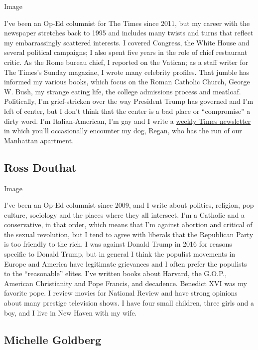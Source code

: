 Image

I've been an Op-Ed columnist for The Times since 2011, but my career
with the newspaper stretches back to 1995 and includes many twists and
turns that reflect my embarrassingly scattered interests. I covered
Congress, the White House and several political campaigns; I also spent
five years in the role of chief restaurant critic. As the Rome bureau
chief, I reported on the Vatican; as a staff writer for The Times's
Sunday magazine, I wrote many celebrity profiles. That jumble has
informed my various books, which focus on the Roman Catholic Church,
George W. Bush, my strange eating life, the college admissions process
and meatloaf. Politically, I'm grief-stricken over the way President
Trump has governed and I'm left of center, but I don't think that the
center is a bad place or ``compromise'' a dirty word. I'm
Italian-American, I'm gay and I write a
\href{https://www.nytimes3xbfgragh.onion/newsletters/frank-bruni}{weekly
Times newsletter} in which you'll occasionally encounter my dog, Regan,
who has the run of our Manhattan apartment.

\hypertarget{ross-douthat}{%
\subsection{Ross Douthat}\label{ross-douthat}}

Image

I've been an Op-Ed columnist since 2009, and I write about politics,
religion, pop culture, sociology and the places where they all
intersect. I'm a Catholic and a conservative, in that order, which means
that I'm against abortion and critical of the sexual revolution, but I
tend to agree with liberals that the Republican Party is too friendly to
the rich. I was against Donald Trump in 2016 for reasons specific to
Donald Trump, but in general I think the populist movements in Europe
and America have legitimate grievances and I often prefer the populists
to the ``reasonable'' elites. I've written books about Harvard, the
G.O.P., American Christianity and Pope Francis, and decadence. Benedict
XVI was my favorite pope. I review movies for National Review and have
strong opinions about many prestige television shows. I have four small
children, three girls and a boy, and I live in New Haven with my wife.

\hypertarget{michelle-goldberg}{%
\subsection{Michelle Goldberg}\label{michelle-goldberg}}

